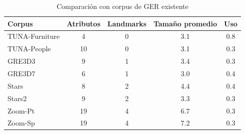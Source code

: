 \begin{table}[H]
\begin{center}
\footnotesize{
\caption{Comparaci\'on con corpus de GER existente}
\label{tab-comparison}
\begin{tabular} {  l c c c c}
\hline
Corpus											& Atributos			& Landmarks			& Tama\~{n}o promedio	& Uso \\
\hline
TUNA-Furniture							& 4								& 0							& 3.1				& 0.8   \\
TUNA-People									& 10							& 0							& 3.1				& 0.3   \\
GRE3D3											& 9								& 1							& 3.4				& 0.3   \\
GRE3D7											& 6								& 1							& 3.0				& 0.4   \\
Stars												& 8								& 2							& 4.4				& 0.4   \\
Stars2											& 9								& 2							& 3.3				& 0.3   \\
Zoom-Pt											& 19							& 4							& 6.7				& 0.3   \\
Zoom-Sp											& 19							& 4							& 7.2				& 0.3   \\
\hline
\end{tabular}
}
\end{center}
\end{table}



%
%

